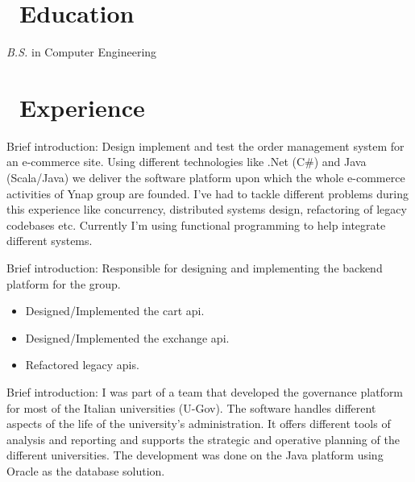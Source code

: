 \documentclass{resume}
\begin{document}



\section{\faGraduationCap\ Education}
\textit{B.S.} in Computer Engineering

\section{\faUsers\ Experience}
Brief introduction: Design implement and test the order management system for an e-commerce site.
Using different technologies like .Net (C\#) and Java (Scala/Java) we deliver the software platform upon which the whole e-commerce activities of Ynap group are founded.
I’ve had to tackle different problems during this experience like concurrency, distributed systems design, refactoring of legacy codebases etc.
Currently I’m using functional programming to help integrate different systems.

\datedsubsection{\textbf{Yoox Group}}{Nov. 2013 -- Feb. 2017}
Brief introduction: Responsible for designing and implementing the backend platform for the group.
\begin{itemize}
  \item Designed/Implemented the cart api.
  \item Designed/Implemented the exchange api.
  \item Refactored legacy apis.
\end{itemize}

Brief introduction:
I was part of a team that developed the governance platform for most of the Italian universities (U-Gov).
The software handles different aspects of the life of the university's administration. It offers different tools of analysis and reporting and supports the strategic and operative planning of the different universities.
The development was done on the Java platform using Oracle as the database solution.
\end{document}
